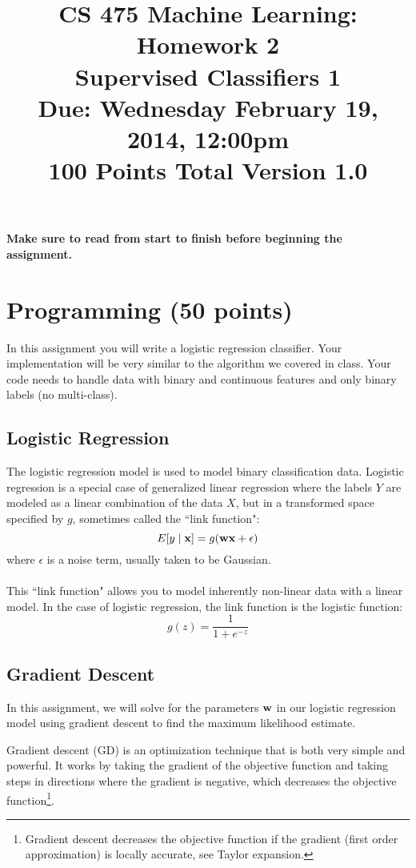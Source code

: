 \documentclass[11pt]{article}
\title{CS 475 Machine Learning: Homework 2\\Supervised Classifiers 1\\
\Large{Due: Wednesday February 19, 2014, 12:00pm}\\
100 Points Total \hspace{1cm} Version 1.0}
\author{}
\date{}
\newcommand{\vw}{{\bf w}}
\newcommand{\vx}{{\bf x}}
\begin{document}
\large
\maketitle
\thispagestyle{headings}

\vspace{-.5in}

{\bf Make sure to read from start to finish before beginning the assignment.}
\section{Programming (50 points)}
In this assignment you will write a logistic regression classifier. Your implementation will be very similar to 
the algorithm we covered in class. Your code needs to handle data with binary and continuous features and only binary labels (no multi-class).

\subsection{Logistic Regression}
The logistic regression model is used to model binary classification data. Logistic regression is a special case of generalized linear regression where the labels $Y$ are modeled as a linear combination of the data $X$, but in a transformed space specified by $g$, sometimes called the ``link function":
\begin{equation}
E[y \mid \vx] = g(\vw \vx + \epsilon)
\end{equation}
where $\epsilon$ is a noise term, usually taken to be Gaussian.\\
\\
This ``link function" allows you to model inherently non-linear data with a linear model. In the case of logistic regression, the link function is the logistic function:
\begin{equation}
g(z) = \frac{1}{1 + e^{-z}}
\end{equation}

\subsection{Gradient Descent}
In this assignment, we will solve for the parameters $\vw$ in our logistic regression model using gradient descent to find the maximum likelihood estimate.

Gradient descent (GD) is an optimization technique that is both very simple and powerful. It works by taking the gradient of the objective function and taking steps in directions where the gradient is negative, which decreases the objective function\footnote{Gradient descent decreases the objective function if the gradient (first order approximation) is locally accurate, see Taylor expansion.}. 
\end{document}

